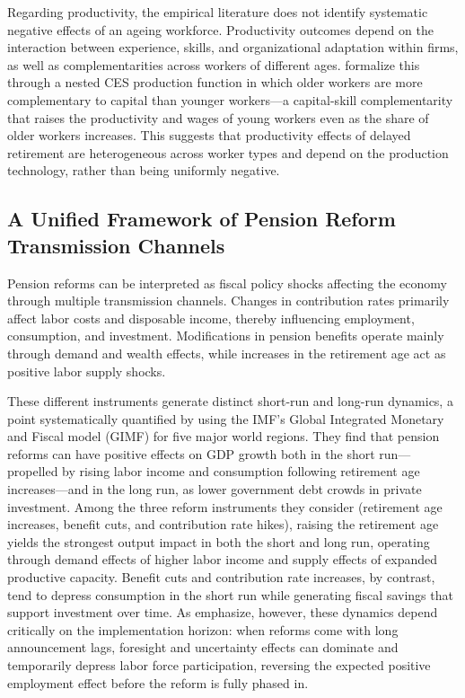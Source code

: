 \documentclass[11pt,english,a4paper, twoside, authoryear]{article}
\begin{document}
Regarding productivity, the empirical literature does not identify systematic negative effects of an ageing workforce. Productivity outcomes depend on the interaction between experience, skills, and organizational adaptation within firms, as well as complementarities across workers of different ages. \citet{Dai2022} formalize this through a nested CES production function in which older workers are more complementary to capital than younger workers---a capital-skill complementarity that raises the productivity and wages of young workers even as the share of older workers increases. This suggests that productivity effects of delayed retirement are heterogeneous across worker types and depend on the production technology, rather than being uniformly negative.


\subsection{A Unified Framework of Pension Reform Transmission Channels}

Pension reforms can be interpreted as fiscal policy shocks affecting the economy through multiple transmission channels. Changes in contribution rates primarily affect labor costs and disposable income, thereby influencing employment, consumption, and investment. Modifications in pension benefits operate mainly through demand and wealth effects, while increases in the retirement age act as positive labor supply shocks.

These different instruments generate distinct short-run and long-run dynamics, a point systematically quantified by \citet{KaramMuirPereiraTuladhar2010} using the IMF's Global Integrated Monetary and Fiscal model (GIMF) for five major world regions. They find that pension reforms can have positive effects on GDP growth both in the short run---propelled by rising labor income and consumption following retirement age increases---and in the long run, as lower government debt crowds in private investment. Among the three reform instruments they consider (retirement age increases, benefit cuts, and contribution rate hikes), raising the retirement age yields the strongest output impact in both the short and long run, operating through demand effects of higher labor income and supply effects of expanded productive capacity. Benefit cuts and contribution rate increases, by contrast, tend to depress consumption in the short run while generating fiscal savings that support investment over time. As \citet{BiZubairy2023} emphasize, however, these dynamics depend critically on the implementation horizon: when reforms come with long announcement lags, foresight and uncertainty effects can dominate and temporarily depress labor force participation, reversing the expected positive employment effect before the reform is fully phased in.
\end{document}
